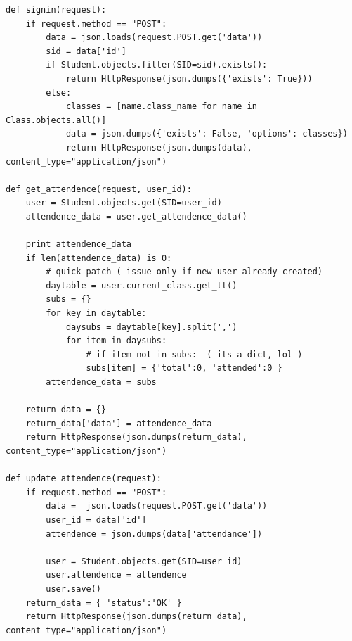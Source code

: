 \documentclass{article}
\begin{document}
\begin{lstlisting}
def signin(request):
    if request.method == "POST":
        data = json.loads(request.POST.get('data'))
        sid = data['id']
        if Student.objects.filter(SID=sid).exists():
            return HttpResponse(json.dumps({'exists': True}))
        else:
            classes = [name.class_name for name in Class.objects.all()]
            data = json.dumps({'exists': False, 'options': classes})
            return HttpResponse(json.dumps(data), content_type="application/json")

def get_attendence(request, user_id):
    user = Student.objects.get(SID=user_id)
    attendence_data = user.get_attendence_data()

    print attendence_data
    if len(attendence_data) is 0:
        # quick patch ( issue only if new user already created)
        daytable = user.current_class.get_tt()
        subs = {}
        for key in daytable:
            daysubs = daytable[key].split(',')
            for item in daysubs:
                # if item not in subs:  ( its a dict, lol )
                subs[item] = {'total':0, 'attended':0 }
        attendence_data = subs

    return_data = {}
    return_data['data'] = attendence_data
    return HttpResponse(json.dumps(return_data), content_type="application/json")

def update_attendence(request):
    if request.method == "POST":
        data =  json.loads(request.POST.get('data'))
        user_id = data['id']
        attendence = json.dumps(data['attendance'])

        user = Student.objects.get(SID=user_id)
        user.attendence = attendence
        user.save()
    return_data = { 'status':'OK' }
    return HttpResponse(json.dumps(return_data), content_type="application/json")

\end{lstlisting}
\end{document}
